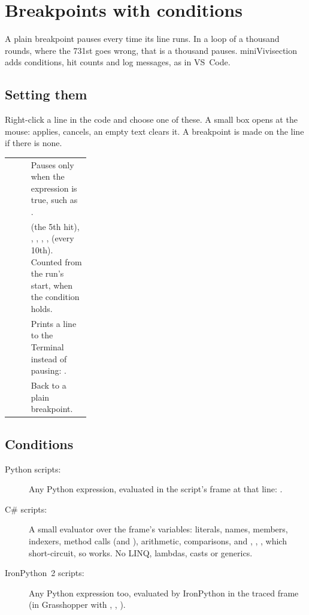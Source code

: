 \chapter{Breakpoints with conditions}\label{ch:breakpoints}

A plain breakpoint pauses every time its line runs. In a loop of a thousand rounds, where the 731st goes
wrong, that is a thousand pauses. miniVivisection adds conditions, hit counts and log messages, as in
VS~Code.

\section{Setting them}

Right-click a line in the code and choose one of these. A small box opens at the mouse: 
applies,  cancels, an empty text clears it. A breakpoint is made on the line if there is none.

\begin{xltabular}{\linewidth}{@{}P{0.27\linewidth}L@{}}
\toprule
{} & Pauses only when the expression is true, such as . \\
            &  (the 5th hit), , , , ,  (every 10th). Counted from the run's start, when the condition holds. \\
          & Prints a line to the Terminal instead of pausing: . \\
      & Back to a plain breakpoint. \\
\bottomrule
\end{xltabular}

\section{Conditions}\label{sec:conditions}

\begin{description}
  \item[Python scripts:] Any Python expression, evaluated in the script's frame at that line:
        .
  \item[C\# scripts:] A small evaluator over the frame's variables: literals, names, members, indexers,
        method calls (and ), arithmetic, comparisons, and \code{\&\&}, \code{||}, \code{!}, which
        short-circuit, so  works. No LINQ, lambdas, casts or generics.
  \item[IronPython~2 scripts:] Any Python expression too, evaluated by IronPython in the traced frame
        (in Grasshopper with , , ).
\end{description}

